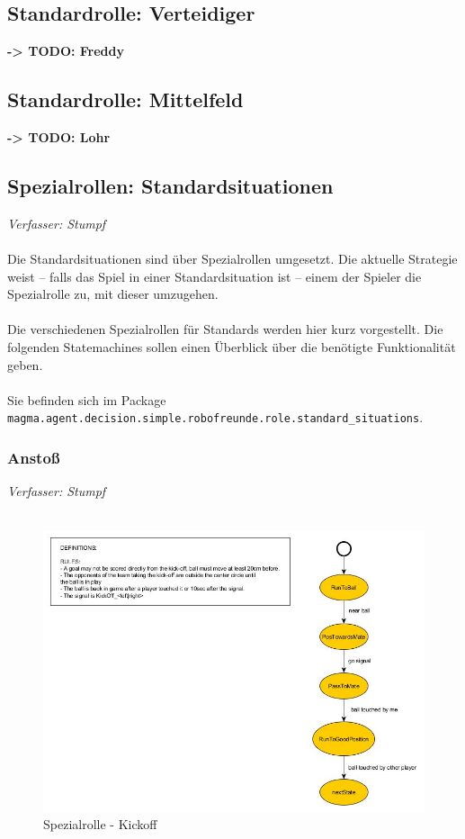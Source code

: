 \documentclass[fontsize=12pt,a4paper,final]{scrartcl}[2003/01/01]
\begin{document}
\subsection{Standardrolle: Verteidiger}
\textbf{-> TODO: Freddy}
\subsection{Standardrolle: Mittelfeld}
\textbf{-> TODO: Lohr}
\subsection{Spezialrollen: Standardsituationen}
\textit{Verfasser: Stumpf}\\
\\
Die Standardsituationen sind über Spezialrollen umgesetzt. Die aktuelle Strategie weist -- falls das Spiel in einer Standardsituation ist -- einem der Spieler die Spezialrolle zu, mit dieser umzugehen.\\
\\
Die verschiedenen Spezialrollen für Standards werden hier kurz vorgestellt. Die folgenden Statemachines sollen einen Überblick über die benötigte Funktionalität geben.\\
\\
Sie befinden sich im Package\\\texttt{magma.agent.decision.simple.robofreunde.role.standard\_situations}.

\subsubsection{Ansto{\ss}}
\textit{Verfasser: Stumpf}\\
\\
\begin{figure}[H]
	\centering
	\includegraphics[width=\textwidth]{Grafiken/KI/Standardsituationen/KickoffSM}
	\caption{Spezialrolle - Kickoff}
	\label{fig:Standard - Kickoff}
\end{figure}
\end{document}

